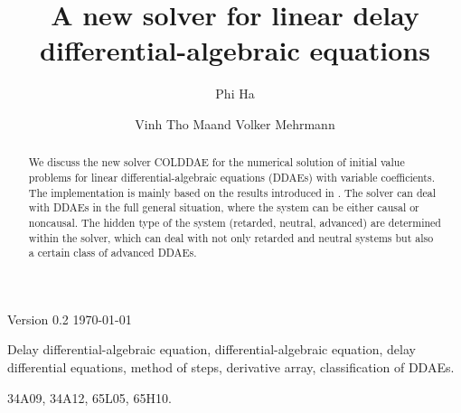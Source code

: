 \documentclass[final,reqno]{siamltex}
\begin{document}
\title{A new solver for linear delay differential-algebraic equations\footnotemark[1]}

\author{Phi Ha\footnotemark[2] \and Vinh Tho Ma\footnotemark[2] and Volker Mehrmann\footnotemark[2]}

\renewcommand{\thefootnote}{\fnsymbol{footnote}}


\maketitle

\newcommand{\thedate}{Version 0.2 \quad \today}

\begin{center}
\thedate
\end{center}

\vskip 0.2cm

\begin{abstract}
We discuss the new solver COLDDAE for the numerical solution of initial value problems for linear differential-algebraic equations (DDAEs) with variable coefficients. The implementation is mainly 
based on the results introduced in \cite{HaM14}. The solver can deal with DDAEs in the full general situation, where the system can be either causal or noncausal. 
The hidden type of the system (retarded, neutral, advanced) are determined within the solver, which can deal with not only retarded and neutral systems but also a 
certain class of advanced DDAEs.
\end{abstract}

\begin{keywords} Delay differential-algebraic equation, differential-algebraic equation, delay differential equations, method of steps, derivative array, classification of DDAEs.
\end{keywords}

\begin{AMS}
34A09, 34A12, 65L05, 65H10.
\end{AMS}

\pagestyle{myheadings}
\thispagestyle{plain}
\end{document}
